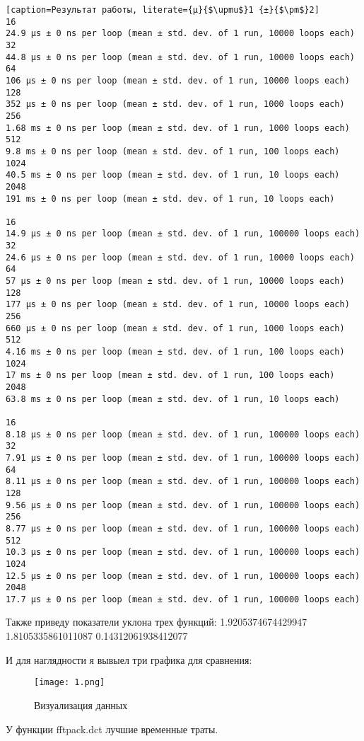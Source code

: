 \documentclass[a4paper,12pt]{report}
\begin{document}
\begin{lstlisting}[caption=Результат работы, literate={µ}{$\upmu$}1 {±}{$\pm$}2]
16
24.9 µs ± 0 ns per loop (mean ± std. dev. of 1 run, 10000 loops each)
32
44.8 µs ± 0 ns per loop (mean ± std. dev. of 1 run, 10000 loops each)
64
106 µs ± 0 ns per loop (mean ± std. dev. of 1 run, 10000 loops each)
128
352 µs ± 0 ns per loop (mean ± std. dev. of 1 run, 1000 loops each)
256
1.68 ms ± 0 ns per loop (mean ± std. dev. of 1 run, 1000 loops each)
512
9.8 ms ± 0 ns per loop (mean ± std. dev. of 1 run, 100 loops each)
1024
40.5 ms ± 0 ns per loop (mean ± std. dev. of 1 run, 10 loops each)
2048
191 ms ± 0 ns per loop (mean ± std. dev. of 1 run, 10 loops each)

16
14.9 µs ± 0 ns per loop (mean ± std. dev. of 1 run, 100000 loops each)
32
24.6 µs ± 0 ns per loop (mean ± std. dev. of 1 run, 10000 loops each)
64
57 µs ± 0 ns per loop (mean ± std. dev. of 1 run, 10000 loops each)
128
177 µs ± 0 ns per loop (mean ± std. dev. of 1 run, 10000 loops each)
256
660 µs ± 0 ns per loop (mean ± std. dev. of 1 run, 1000 loops each)
512
4.16 ms ± 0 ns per loop (mean ± std. dev. of 1 run, 100 loops each)
1024
17 ms ± 0 ns per loop (mean ± std. dev. of 1 run, 100 loops each)
2048
63.8 ms ± 0 ns per loop (mean ± std. dev. of 1 run, 10 loops each)

16
8.18 µs ± 0 ns per loop (mean ± std. dev. of 1 run, 100000 loops each)
32
7.91 µs ± 0 ns per loop (mean ± std. dev. of 1 run, 100000 loops each)
64
8.11 µs ± 0 ns per loop (mean ± std. dev. of 1 run, 100000 loops each)
128
9.56 µs ± 0 ns per loop (mean ± std. dev. of 1 run, 100000 loops each)
256
8.77 µs ± 0 ns per loop (mean ± std. dev. of 1 run, 100000 loops each)
512
10.3 µs ± 0 ns per loop (mean ± std. dev. of 1 run, 100000 loops each)
1024
12.5 µs ± 0 ns per loop (mean ± std. dev. of 1 run, 100000 loops each)
2048
17.7 µs ± 0 ns per loop (mean ± std. dev. of 1 run, 100000 loops each)
\end{lstlisting}

Также приведу показатели уклона трех функций:
1.9205374674429947
1.8105335861011087
0.14312061938412077

И для наглядности я вывыел три графика для сравнения:

\begin{figure}[H]
        \centering
        \texttt{[image: 1.png]}
        \caption{Визуализация данных}
        \label{fig:lab6_fig1_1}
\end{figure}

У функции fftpack.dct лучшие временные траты. 
\end{document}
